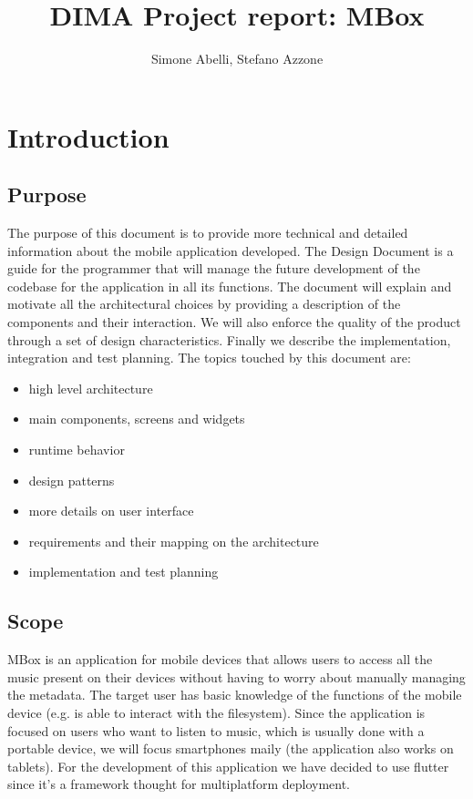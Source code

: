 \documentclass{article}
\author{Simone Abelli, Stefano Azzone}
\title{DIMA Project report: MBox}
\begin{document}
\maketitle
\newpage
\tableofcontents
\newpage
\section{Introduction}
\subsection{Purpose}
The purpose of this document is to provide more technical and detailed
information about the mobile application developed. The Design Document is a
guide for the programmer that will manage the future development of the codebase
for the application in all its functions. The document will explain and motivate
all the architectural choices by providing a description of the components and
their interaction. We will also enforce the quality of the product through a set
of design characteristics. Finally we describe the implementation, integration
and test planning.
The topics touched by this document are:
\begin{itemize}
	\item high level architecture
	\item main components, screens and widgets
	\item runtime behavior
	\item design patterns
	\item more details on user interface
	\item requirements and their mapping on the architecture
	\item implementation and test planning
\end{itemize}

\subsection{Scope}
MBox is an application for mobile devices that allows users to access all the
music present on their devices without having to worry about manually managing 
the metadata. The target user has basic knowledge of the functions of the
mobile device (e.g. is able to interact with the filesystem). Since the
application is focused on users who want to listen to music, which is usually
done with a portable device, we will focus smartphones maily (the application
also works on tablets). For the development of this application we have decided
to use flutter since it's a framework thought for multiplatform deployment.
\end{document}
